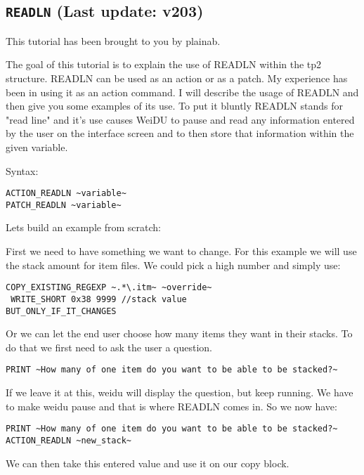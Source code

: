 \documentclass{article}
\def\DEFINE#1{{\tt \bf #1}\label{#1}\index{#1}}
\begin{document}
\subsection{\DEFINE{READLN} (Last update: v203)}

This tutorial has been brought to you by plainab.

The goal of this tutorial is to explain the use of READLN within the tp2 structure.
READLN can be used as an action or as a patch.  My experience has been in using it
as an action command. I will describe the usage of READLN and then give you some
examples of its use.  To put it bluntly READLN stands for "read line" and it's use
causes WeiDU to pause and read any information entered by the user on the interface
screen and to then store that information within the given variable.

Syntax:
\begin{verbatim}
ACTION_READLN ~variable~
PATCH_READLN ~variable~
\end{verbatim}

Lets build an example from scratch:

First we need to have something we want to change.  For this example we will use the
stack amount for item files.  We could pick a high number and simply use:

\begin{verbatim}
COPY_EXISTING_REGEXP ~.*\.itm~ ~override~
 WRITE_SHORT 0x38 9999 //stack value
BUT_ONLY_IF_IT_CHANGES
\end{verbatim}

Or we can let the end user choose how many items they want in their stacks. 
To do that we first need to ask the user a question.

\begin{verbatim}
PRINT ~How many of one item do you want to be able to be stacked?~
\end{verbatim}

If we leave it at this, weidu will display the question, but keep running.
We have to make weidu pause and that is where READLN comes in. So we now have:

\begin{verbatim}
PRINT ~How many of one item do you want to be able to be stacked?~
ACTION_READLN ~new_stack~
\end{verbatim}

We can then take this entered value and use it on our copy block.
\end{document}
